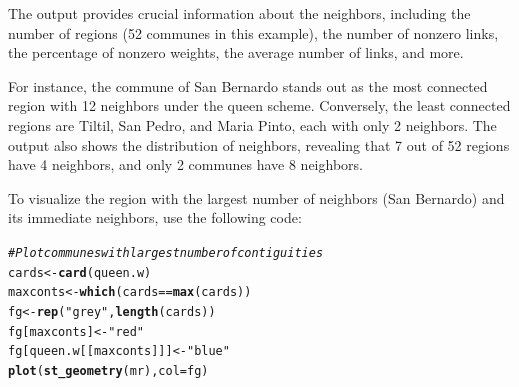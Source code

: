\documentclass[english,12pt]{book}\usepackage[]{graphicx}\usepackage[]{xcolor}
\makeatletter
\newcommand{\hlsng}[1]{\textcolor[rgb]{0.192,0.494,0.8}{#1}}%
\newcommand{\hlcom}[1]{\textcolor[rgb]{0.678,0.584,0.686}{\textit{#1}}}%
\newcommand{\hlopt}[1]{\textcolor[rgb]{0,0,0}{#1}}%
\newcommand{\hldef}[1]{\textcolor[rgb]{0.345,0.345,0.345}{#1}}%
\newcommand{\hlkwb}[1]{\textcolor[rgb]{0.69,0.353,0.396}{#1}}%
\newcommand{\hlkwc}[1]{\textcolor[rgb]{0.333,0.667,0.333}{#1}}%
\newcommand{\hlkwd}[1]{\textcolor[rgb]{0.737,0.353,0.396}{\textbf{#1}}}%
\newenvironment{kframe}{%
 \def\at@end@of@kframe{}%
 \ifinner\ifhmode%
  \def\at@end@of@kframe{\end{minipage}}%
  \begin{minipage}{\columnwidth}%
 \fi\fi%
 \def\FrameCommand##1{\hskip\@totalleftmargin \hskip-\fboxsep
 \colorbox{shadecolor}{##1}\hskip-\fboxsep
     \hskip-\linewidth \hskip-\@totalleftmargin \hskip\columnwidth}%
 \MakeFramed {\advance\hsize-\width
   \@totalleftmargin\z@ \linewidth\hsize
   \@setminipage}}%
 {\par\unskip\endMakeFramed%
 \at@end@of@kframe}
\newenvironment{knitrout}{}{} %
\makeatother
\begin{document}
The output provides crucial information about the neighbors, including the number of regions (52 communes in this example), the number of nonzero links, the percentage of nonzero weights, the average number of links, and more.

For instance, the commune of San Bernardo stands out as the most connected region with 12 neighbors under the queen scheme. Conversely, the least connected regions are Tiltil, San Pedro, and Maria Pinto, each with only 2 neighbors. The output also shows the distribution of neighbors, revealing that 7 out of 52 regions have 4 neighbors, and only 2 communes have 8 neighbors.

To visualize the region with the largest number of neighbors (San Bernardo) and its immediate neighbors, use the following code:
\begin{knitrout}
\color{fgcolor}\begin{kframe}
\begin{alltt}
\hlcom{# Plot communes with largest number of contiguities}
\hldef{cards} \hlkwb{<-} \hlkwd{card}\hldef{(queen.w)}
\hldef{maxconts} \hlkwb{<-} \hlkwd{which}\hldef{(cards} \hlopt{==} \hlkwd{max}\hldef{(cards))}
\hldef{fg} \hlkwb{<-} \hlkwd{rep}\hldef{(}\hlsng{"grey"}\hldef{,} \hlkwd{length}\hldef{(cards))}
\hldef{fg[maxconts]} \hlkwb{<-} \hlsng{"red"}
\hldef{fg[queen.w[[maxconts]]]} \hlkwb{<-} \hlsng{"blue"}
\hlkwd{plot}\hldef{(}\hlkwd{st_geometry}\hldef{(mr),} \hlkwc{col} \hldef{= fg)}
\end{alltt}
\end{kframe}
\end{knitrout}
\end{document}
